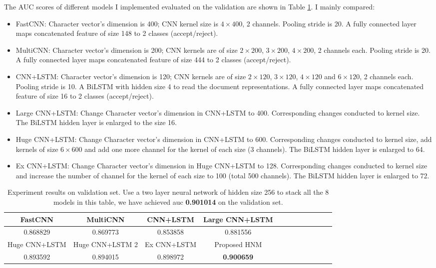 \documentclass{article}
\begin{document}
The AUC scores of different models I implemented evaluated on the validation are shown in Table \ref{tab:result}. I mainly compared:

\begin{itemize}
	\item FastCNN: Character vector's dimension is 400; CNN kernel size is $4\times 400$, 2 channels. Pooling stride is 20. A fully connected layer maps concatenated feature of size 148 to 2 classes (accept/reject).
	\item MultiCNN: Character vector's dimension is 200; CNN kernels are of size $2\times 200$, $3\times 200$, $4\times 200$, 2 channels each. Pooling stride is 20. A fully connected layer maps concatenated feature of size 444 to 2 classes (accept/reject).
	\item CNN+LSTM: Character vector's dimension is 120; CNN kernels are of size $2\times 120$, $3\times 120$, $4\times 120$ and $6\times 120$, 2 channels each. Pooling stride is 10. A BiLSTM with hidden size 4 to read the document representations. A fully connected layer maps concatenated feature of size 16 to 2 classes (accept/reject).
	\item Large CNN+LSTM: Change Character vector's dimension in CNN+LSTM to 400. Corresponding changes conducted to kernel size. The BiLSTM hidden layer is enlarged to the size 16.
	\item Huge CNN+LSTM: Change Character vector's dimension in CNN+LSTM to 600. Corresponding changes conducted to kernel size, add kernels of size $6 \times 600$ and add one more channel for the kernel of each size (3 channels). The BiLSTM hidden layer is enlarged to 64.
	\item Ex CNN+LSTM: Change Character vector's dimension in Huge CNN+LSTM to 128. Corresponding changes conducted to kernel size and increase the number of channel for the kernel of each size to 100 (total 500 channels). The BiLSTM hidden layer is enlarged to 72.
\end{itemize}

\begin{table}[htbp!]
\centering
\begin{tabular}{|c|c|c|c|c|c|c|c|c|c|c|c|}
\hline
	FastCNN & MultiCNN & CNN+LSTM & Large CNN+LSTM\\ 
\hline
	0.868829 & 0.869773 & 0.853858 & 0.881556\\ 
\hline\hline
	Huge CNN+LSTM & Huge CNN+LSTM 2 & Ex CNN+LSTM & Proposed HNM\\ 
\hline
	0.893592 & 0.894015 & 0.898972 & \bf 0.900659\\
\hline
\end{tabular}
\caption{Experiment results on validation set. Use a two layer neural network of hidden size 256 to stack all the 8 models in this table, we have achieved auc {\bf 0.901014} on the validation set.}\label{tab:result}
\end{table}
\end{document}
